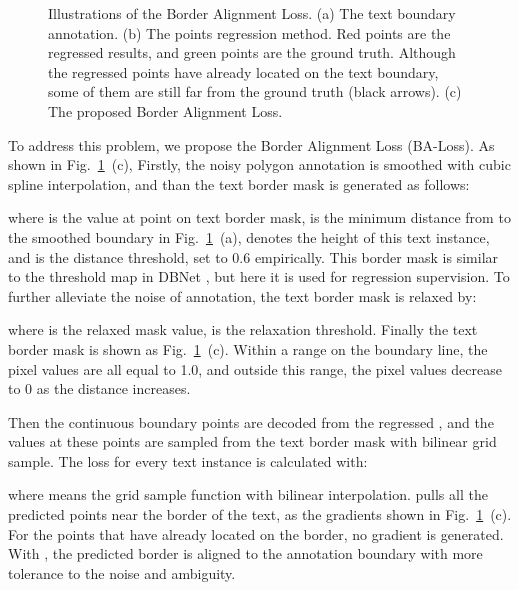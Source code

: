 \documentclass[sigconf]{acmart}
\begin{document}
	\begin{figure}[t]
		\vspace{-0.15cm} 
		\centering
		\setlength{\abovecaptionskip}{5px}
		\subfigbottomskip=-3pt
		\subfigcapskip=-5pt
		\caption{ Illustrations of the Border Alignment Loss. (a) The text boundary annotation. (b) The points regression method. Red points are the regressed results, and green points are the ground truth. Although the regressed points have already located on the text boundary, some of them are still far from the ground truth (black arrows). (c) The proposed Border Alignment Loss.}
		\label{fig:loss}
		\vspace{-15px}
	\end{figure}
	
	To address this problem, we propose the Border Alignment Loss (BA-Loss). As shown in Fig.~\ref{fig:loss}~(c),
	Firstly, the noisy polygon annotation is smoothed with cubic spline interpolation\cite{mckinley1998cubic}, and than
	the text border mask   is generated as follows: 
	
	where  is the value at point  on text border mask,  is the minimum distance from  to the smoothed boundary in Fig.~\ref{fig:loss}~(a),  denotes the height of this text instance, and  is the distance threshold, set to 0.6 empirically. This border mask is similar to the threshold map in DBNet \cite{liao2020db}, but here it is used for regression supervision. To further alleviate the noise of annotation, the text border mask is relaxed by:
	
	where  is the relaxed mask value,  is the relaxation threshold.
	Finally the text border mask is shown as Fig.~\ref{fig:loss}~(c).  Within a range on the boundary line, the pixel values are all equal to 1.0, and outside this range, the pixel values decrease to 0 as the distance increases.
	
	Then the continuous boundary points  are decoded from the regressed , and the values at these points are sampled from the text border mask  with bilinear grid sample. The loss for every text instance is calculated with:
	
	where  means the grid sample function with bilinear interpolation.  pulls all the predicted points near the border of the text, as the gradients shown in Fig.~\ref{fig:loss}~(c). For the points that have already located on the border, no gradient is generated. With , the predicted border is aligned to the annotation boundary with more tolerance to the noise and ambiguity.
	
\end{document}
